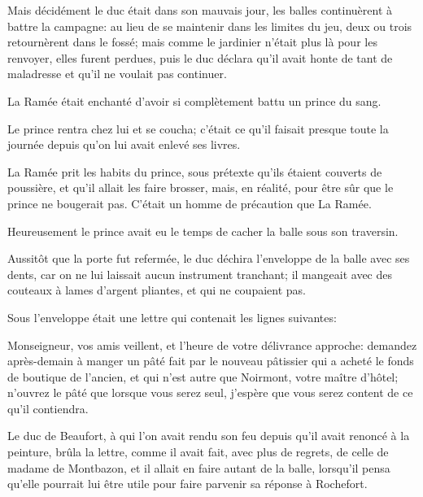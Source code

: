 Mais décidément le duc était dans son mauvais jour, les balles continuèrent à battre la campagne: au lieu de se maintenir dans les limites du jeu, deux ou trois retournèrent dans le fossé; mais comme le jardinier n'était plus là pour les renvoyer, elles furent perdues, puis le duc déclara qu'il avait honte de tant de maladresse et qu'il ne voulait pas continuer.

La Ramée était enchanté d'avoir si complètement battu un prince du sang.

Le prince rentra chez lui et se coucha; c'était ce qu'il faisait presque toute la journée depuis qu'on lui avait enlevé ses livres.

La Ramée prit les habits du prince, sous prétexte qu'ils étaient couverts de poussière, et qu'il allait les faire brosser, mais, en réalité, pour être sûr que le prince ne bougerait pas. C'était un homme de précaution que La Ramée.

Heureusement le prince avait eu le temps de cacher la balle sous son traversin.

Aussitôt que la porte fut refermée, le duc déchira l'enveloppe de la balle avec ses dents, car on ne lui laissait aucun instrument tranchant; il mangeait avec des couteaux à lames d'argent pliantes, et qui ne coupaient pas.

Sous l'enveloppe était une lettre qui contenait les lignes suivantes:

\begin{mail}{}{}
Monseigneur, vos amis veillent, et l'heure de votre délivrance approche: demandez après-demain à manger un pâté fait par le nouveau pâtissier qui a acheté le fonds de boutique de l'ancien, et qui n'est autre que Noirmont, votre maître d'hôtel; n'ouvrez le pâté que lorsque vous serez seul, j'espère que vous serez content de ce qu'il contiendra.



\end{mail}

Le duc de Beaufort, à qui l'on avait rendu son feu depuis qu'il avait renoncé à la peinture, brûla la lettre, comme il avait fait, avec plus de regrets, de celle de madame de Montbazon, et il allait en faire autant de la balle, lorsqu'il pensa qu'elle pourrait lui être utile pour faire parvenir sa réponse à Rochefort.

